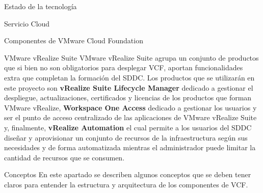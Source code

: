 \begin{chapter}{Estado de la tecnología}
\begin{section}{Servicio Cloud}
\begin{subsection}{Componentes de VMware Cloud Foundation}
    \begin{subsubsection}{VMware vRealize Suite}
        VMware vRealize Suite agrupa un conjunto de productos que si bien no son obligatorios para desplegar VCF, aportan funcionalidades extra que completan la formación del SDDC. Los productos que se utilizarán en este proyecto son \textbf{vRealize Suite Lifecycle Manager} dedicado a gestionar el despliegue, actualizaciones, certificados y licencias de los productos que forman VMware vRealize, \textbf{Workspace One Access} dedicado a gestionar los usuarios y ser el punto de acceso centralizado de las aplicaciones de VMware vRealize Suite y, finalmente, \textbf{vRealize Automation} el cual permite a los usuarios del SDDC diseñar y aprovisionar un conjunto de recursos de la infraestructura según sus necesidades y de forma automatizada mientras el administrador puede limitar la cantidad de recursos que se consumen.
    \end{subsubsection}
    \end{subsection}

    \begin{subsection}{Conceptos}
        En este apartado se describen algunos conceptos que se deben tener claros para entender la estructura y arquitectura de los componentes de VCF.
        
        

\end{subsection}
\end{section}
\end{chapter}
